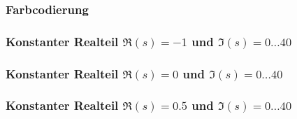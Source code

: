 \documentclass[ngerman, aspectratio=169]{beamer}
\begin{document}
    \begin{frame}
        \frametitle{Farbcodierung}
        \begin{center}
            \scalebox{0.6}{}
        \end{center}
    \end{frame}

    \begin{frame}
        \frametitle{Konstanter Realteil $\Re(s)=-1$ und $\Im(s)=0\ldots40$}
        \begin{center}
            \scalebox{0.6}{}
        \end{center}
    \end{frame}
    \begin{frame}
        \frametitle{Konstanter Realteil $\Re(s)=0$ und $\Im(s)=0\ldots40$}
        \begin{center}
            \scalebox{0.6}{}
        \end{center}
    \end{frame}
    \begin{frame}
        \frametitle{Konstanter Realteil $\Re(s)=0.5$ und $\Im(s)=0\ldots40$}
        \begin{center}
            \scalebox{0.6}{}
        \end{center}
    \end{frame}
\end{document}
